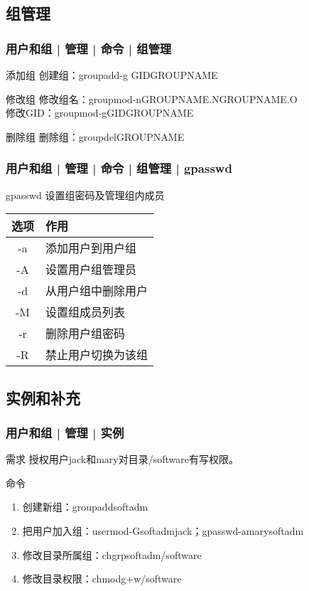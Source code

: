 \subsection{组管理}
\begin{frame}
  \frametitle{用户和组 | 管理 | 命令 | \alert{组管理}}
  \begin{block}{添加组}
    创建组：groupadd\quad -g GID\quad GROUPNAME
  \end{block}
  \pause
  \begin{block}{修改组}
    修改组名：groupmod\quad -n\quad GROUPNAME.N\quad GROUPNAME.O\\
    修改GID：groupmod\quad -g\quad GID\quad GROUPNAME
  \end{block}
  \pause
  \begin{block}{删除组}
    删除组：groupdel\quad GROUPNAME
  \end{block}
\end{frame}

\begin{frame}
  \frametitle{用户和组 | 管理 | 命令 | 组管理 | gpasswd}
  \begin{block}{gpasswd}
    设置组密码及管理组内成员
  \end{block}
  \pause
  \begin{table}
    \centering
    \begin{tabularx}{0.5\textwidth}{cX}
      \rowcolor{blue!50}选项 & 作用\\
      \hline
      -a & 添加用户到用户组\\
      -A & 设置用户组管理员\\
      -d & 从用户组中删除用户\\
      -M & 设置组成员列表\\
      -r & 删除用户组密码\\
      -R & 禁止用户切换为该组\\
      \hline
    \end{tabularx}
  \end{table}
\end{frame}

\subsection{实例和补充}
\begin{frame}
  \frametitle{用户和组 | 管理 | 实例}
  \begin{block}{需求}
    授权用户jack和mary对目录/software有写权限。
  \end{block}
  \pause
  \begin{block}{命令}
    \begin{enumerate}
      \item 创建新组：groupadd\quad softadm
      \item 把用户加入组：usermod\quad -G\quad softadm\quad jack；gpasswd\quad -a\quad mary\quad softadm
      \item 修改目录所属组：chgrp\quad softadm\quad /software
      \item 修改目录权限：chmod\quad g+w\quad /software
    \end{enumerate}
  \end{block}
\end{frame}

